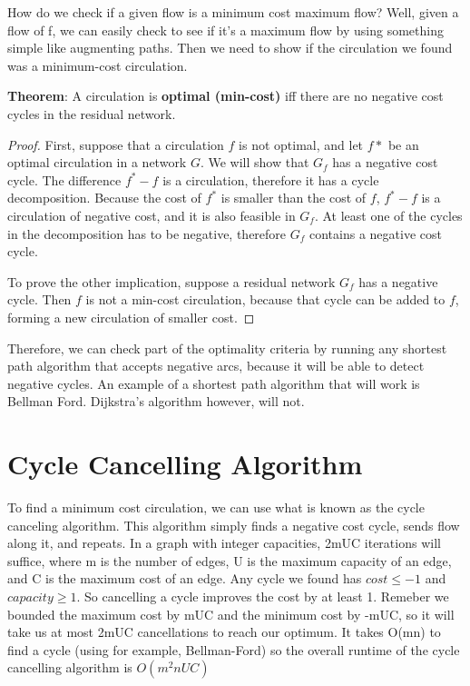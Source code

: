 \documentclass{article}
\begin{document}
How do we check if a given flow is a minimum cost maximum flow?  Well, given a flow of f, we can easily check to see if it's a maximum flow by using something simple like augmenting paths.  Then we need to show if the circulation we found was a minimum-cost circulation.  

\textbf{Theorem}:
A circulation is {\bf optimal (min-cost)} iff there are no negative cost cycles in the residual network.

\begin{proof}
First, suppose that a circulation $f$ is not optimal, and let $f*$ be an optimal circulation in a network $G$. We will show that $G_f$ has a negative cost cycle. 
The difference $f^* - f$ is a circulation, therefore it has a cycle decomposition. Because the cost of $f^*$ is smaller than the cost of $f$, $f^* - f$ is a circulation of negative cost, and it is also feasible in $G_f$. At least one of the cycles in the decomposition has to be negative, therefore $G_f$ contains a negative cost cycle.

To prove the other implication, suppose a residual network $G_f$ has a negative cycle. Then $f$ is not a min-cost circulation, because that cycle can be added to $f$, forming a new circulation of smaller cost. 
\end{proof}

Therefore, we can check part of the optimality criteria by running any shortest path algorithm that accepts negative arcs, because it will be able to detect negative cycles.  An example of a shortest path algorithm that will work is Bellman Ford.  Dijkstra's algorithm however, will not.  

\section{Cycle Cancelling Algorithm}
To find a minimum cost circulation, we can use what is known as the cycle canceling algorithm.  This algorithm simply finds a negative cost cycle, sends flow along it, and repeats.  In a graph with integer capacities, 2mUC iterations will suffice, where m is the number of edges, U is the maximum capacity of an edge, and C is the maximum cost of an edge.  Any cycle we found has $cost \leq -1$ and $capacity \geq 1$.  So cancelling a cycle improves the cost by at least 1.  Remeber we bounded the maximum cost by mUC and the minimum cost by -mUC, so it will take us at most 2mUC cancellations to reach our optimum.  It takes O(mn) to find a cycle (using for example, Bellman-Ford) so the overall runtime of the cycle cancelling algorithm is $O(m^2nUC)$
\end{document}
